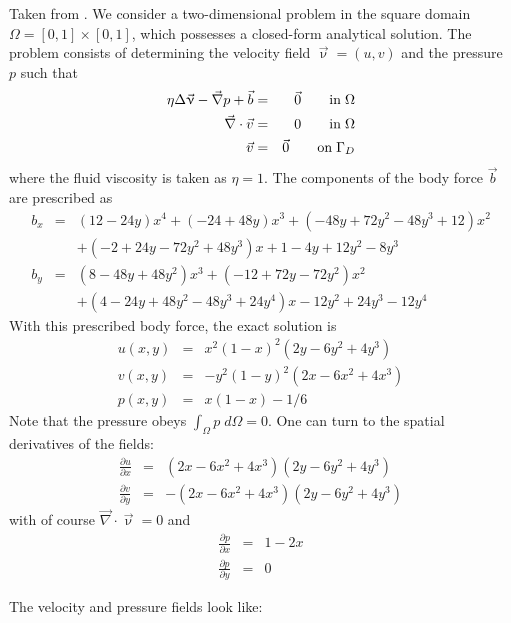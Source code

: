 Taken from \cite{dohu03}. We consider a two-dimensional problem 
in the square domain $\Omega=[0,1]\times[0,1]$, which possesses a closed-form analytical 
solution. The problem consists of determining the velocity field ${\vec \upnu} = (u,v)$ 
and the pressure $p$ such that 
\begin{eqnarray}
\eta \Delta {\vec \upnu} - {\vec \nabla} p + {\vec b} &=& \vec 0 \quad\quad {\rm in} \; \Omega\\
\vec{\nabla} \cdot \vec{v} &=& 0 \quad\quad {\rm in} \; \Omega\\
\vec{v}&=&\vec{0} \quad\quad {\rm on} \; \Gamma_D
\end{eqnarray}
where the fluid viscosity is taken as $\eta=1$.
The components of the body force $\vec{b}$ are prescribed as 
\begin{eqnarray}
b_x &=& (12 - 24y) x^4 + (-24 + 48y) x^3 + (-48y + 72y^2 - 48 y^3 + 12) x^2 \nonumber\\
    && + (-2 + 24y -72y^2+48y^3)x + 1-4y + 12y^2-8y^3 \nonumber\\ 
b_y &=& (8 - 48y + 48 y^2) x^3 + (-12 + 72y - 72y^2) x^2  \nonumber\\
    && + (4 - 24y + 48y^2 - 48y^3 + 24y^4) x - 12y^2 + 24y^3 - 12y^4  \nonumber
\end{eqnarray}
With this prescribed body force, the exact solution is 
\begin{eqnarray}
u(x,y) &=& x^2(1- x)^2 (2y - 6y^2 + 4y^3)  \nonumber\\
v(x,y) &=& -y^2 (1 - y)^2 (2x - 6x^2 + 4x^3) \nonumber\\
p(x,y) &=& x(1 -x)- 1/6 \nonumber 
\end{eqnarray}
Note that the pressure obeys $\int_{\Omega} p \; d\Omega = 0$.
One can turn to the spatial derivatives of the fields:
\begin{eqnarray}
\frac{\partial u}{\partial x} &=&  (2x -6x^2 +4 x^3 ) (2y - 6y^2 + 4y^3)  \\
\frac{\partial v}{\partial y} &=&  - (2x -6x^2 +4 x^3 ) (2y - 6y^2 + 4y^3)  
\end{eqnarray}
with of course  ${\vec \nabla} \cdot {\vec \upnu} = 0$ and 
\begin{eqnarray}
\frac{\partial p}{\partial x} &=& 1-2x  \\
\frac{\partial p}{\partial y} &=& 0
\end{eqnarray}

The velocity and pressure fields look like:

